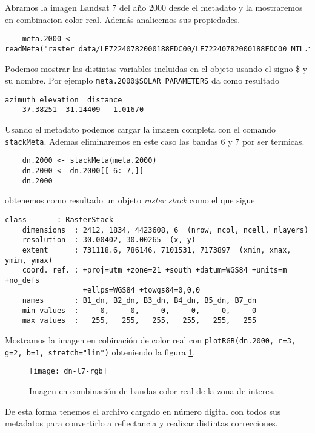 \begin{exa}
    Abramos  la imagen Landsat 7
    del año 2000 desde el metadato y la mostraremos en combinacion color real.
    Adem\'as analicemos sus propiedades.
    \begin{lstlisting}
    meta.2000 <- readMeta("raster_data/LE72240782000188EDC00/LE72240782000188EDC00_MTL.txt")
    \end{lstlisting}
    Podemos mostrar las distintas variables incluidas en el objeto usando el
    signo \$ y su nombre. Por ejemplo \verb|meta.2000$SOLAR_PARAMETERS|
    da como resultado
    \begin{Verbatim}[fontsize=\small]
     azimuth elevation  distance
    37.38251  31.14409   1.01670
    \end{Verbatim}
    Usando el metadato podemos cargar la imagen completa con el comando
    \texttt{stackMeta}. Ademas eliminaremos en este caso las bandas 6 y 7 por
    ser termicas.
    \begin{lstlisting}
    dn.2000 <- stackMeta(meta.2000)
    dn.2000 <- dn.2000[[-6:-7,]]
    dn.2000
    \end{lstlisting}
    obtenemos como resultado un objeto \emph{raster stack} como el que sigue
    \begin{Verbatim}[fontsize=\small]
    class       : RasterStack
    dimensions  : 2412, 1834, 4423608, 6  (nrow, ncol, ncell, nlayers)
    resolution  : 30.00402, 30.00265  (x, y)
    extent      : 731118.6, 786146, 7101531, 7173897  (xmin, xmax, ymin, ymax)
    coord. ref. : +proj=utm +zone=21 +south +datum=WGS84 +units=m +no_defs
                  +ellps=WGS84 +towgs84=0,0,0
    names       : B1_dn, B2_dn, B3_dn, B4_dn, B5_dn, B7_dn
    min values  :     0,     0,     0,     0,     0,     0
    max values  :   255,   255,   255,   255,   255,   255
    \end{Verbatim}
    Mostramos la imagen en cobinaci\'on de color real con \texttt{plotRGB(dn.2000, r=3, g=2, b=1, stretch="lin")}
    obteniendo la figura \ref{fig:dn-l7-rgb}.
     \begin{figure}[h!]
     \begin{center}
         \texttt{[image: dn-l7-rgb]}
     \end{center}
     \caption{Imagen en combinaci\'on de bandas color real de la zona de interes.}
     \label{fig:dn-l7-rgb}
     \end{figure}
\end{exa}

De esta forma tenemos el archivo cargado en n\'umero digital con todos sus metadatos
para convertirlo a reflectancia y realizar distintas correcciones.

